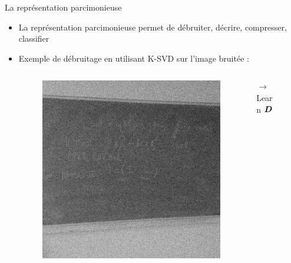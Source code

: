 \begin{frame}{La représentation parcimonieuse}
\begin{itemize}
\item La représentation parcimonieuse permet de débruiter, décrire, compresser, classifier
\item Exemple de débruitage en utilisant K-SVD sur l'image bruitée :
	\begin{columns}
	\begin{column}{0.30\textwidth} \begin{figure}\centering
		\includegraphics[width=\textwidth]{figures/exple-denoise/noisy.jpg}
	\end{figure}\end{column}
	\begin{column}{0.1\textwidth} \centering
		$\rightarrow$
		Learn $\bm{D}$
	\end{column}
	\begin{column}{0.30\textwidth} \begin{figure}\centering

\end{figure}
\end{column}
\end{columns}
\end{itemize}
\end{frame}
